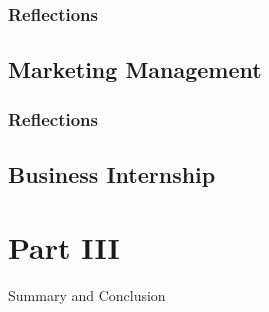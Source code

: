 \documentclass[12pt,titlepage]{article}
\begin{document}
\subsubsection{Reflections}




\subsection{Marketing Management}
\subsubsection{Reflections}

\subsection{Business Internship}



\section{Part III}{Summary and Conclusion}



\end{document}
